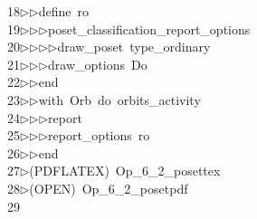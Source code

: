 \begin{tabbing}
18\>$\triangleright$\>$\triangleright$\>define\ ro\ \\[0pt]
19\>$\triangleright$\>$\triangleright$\>$\triangleright$\>poset\_classification\_report\_options\ \\[0pt]
20\>$\triangleright$\>$\triangleright$\>$\triangleright$\>$\triangleright$\>draw\_poset\ type\_ordinary\ \\[0pt]
21\>$\triangleright$\>$\triangleright$\>$\triangleright$\>draw\_options\ Do\ \\[0pt]
22\>$\triangleright$\>$\triangleright$\>end\ \\[0pt]
23\>$\triangleright$\>$\triangleright$\>with\ Orb\ do\ orbits\_activity\ \\[0pt]
24\>$\triangleright$\>$\triangleright$\>$\triangleright$\>report\ \ \\[0pt]
25\>$\triangleright$\>$\triangleright$\>$\triangleright$\>report\_options\ ro\ \\[0pt]
26\>$\triangleright$\>$\triangleright$\>end\ \\[0pt]
27\>$\triangleright$\>(PDFLATEX)\ Op\_6\_2\_posettex\\[0pt]
28\>$\triangleright$\>(OPEN)\ Op\_6\_2\_posetpdf\\[0pt]
29\>\end{tabbing}
